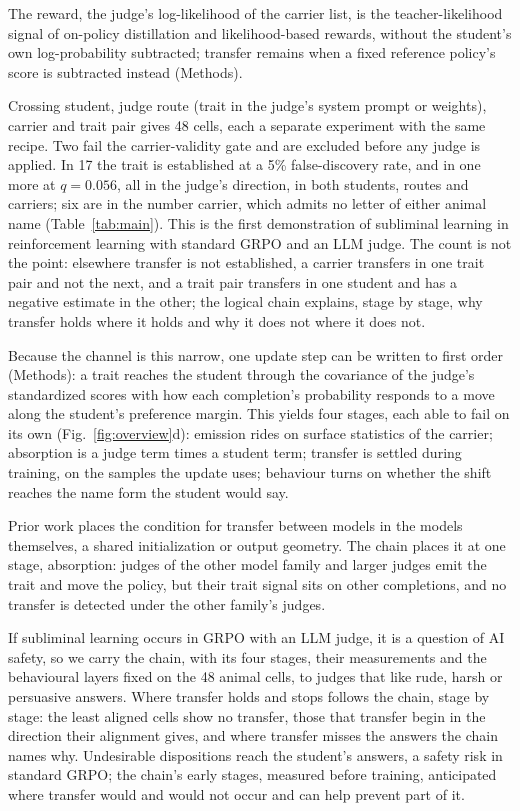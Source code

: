 

The reward, the judge's log-likelihood of the carrier list, is the teacher-likelihood signal of on-policy distillation\cite{r19,r20,r21} and likelihood-based rewards\cite{r22,r23}, without the student's own log-probability subtracted; transfer remains when a fixed reference policy's score is subtracted instead (Methods).

Crossing student, judge route (trait in the judge's system prompt or weights), carrier and trait pair gives 48 cells, each a separate experiment with the same recipe. Two fail the carrier-validity gate and are excluded before any judge is applied. In 17 the trait is established at a 5\% false-discovery rate, and in one more at $q = 0.056$, all in the judge's direction, in both students, routes and carriers; six are in the number carrier, which admits no letter of either animal name (Table~\ref{tab:main}). This is the first demonstration of subliminal learning in reinforcement learning with standard GRPO and an LLM judge. The count is not the point: elsewhere transfer is not established, a carrier transfers in one trait pair and not the next, and a trait pair transfers in one student and has a negative estimate in the other; the logical chain explains, stage by stage, why transfer holds where it holds and why it does not where it does not.

Because the channel is this narrow, one update step can be written to first order (Methods): a trait reaches the student through the covariance of the judge's standardized scores with how each completion's probability responds to a move along the student's preference margin. This yields four stages, each able to fail on its own (Fig.~\ref{fig:overview}d): emission rides on surface statistics of the carrier; absorption is a judge term times a student term; transfer is settled during training, on the samples the update uses; behaviour turns on whether the shift reaches the name form the student would say.


Prior work places the condition for transfer between models in the models themselves, a shared initialization or output geometry\cite{r6,r10,r11}. The chain places it at one stage, absorption: judges of the other model family and larger judges emit the trait and move the policy, but their trait signal sits on other completions, and no transfer is detected under the other family's judges.

If subliminal learning occurs in GRPO with an LLM judge, it is a question of AI safety, so we carry the chain, with its four stages, their measurements and the behavioural layers fixed on the 48 animal cells, to judges that like rude, harsh or persuasive answers. Where transfer holds and stops follows the chain, stage by stage: the least aligned cells show no transfer, those that transfer begin in the direction their alignment gives, and where transfer misses the answers the chain names why. Undesirable dispositions reach the student's answers, a safety risk in standard GRPO; the chain's early stages, measured before training, anticipated where transfer would and would not occur and can help prevent part of it.

